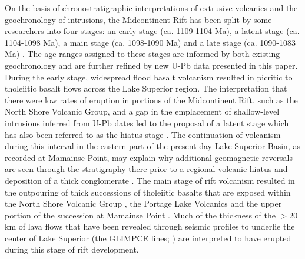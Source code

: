 \documentclass[11pt,letterpaper]{article}
\begin{document}
On the basis of chronostratigraphic interpretations of extrusive volcanics and the geochronology of intrusions, the Midcontinent Rift has been split by some researchers into four stages: an early stage (ca. 1109-1104 Ma), a latent stage (ca. 1104-1098 Ma), a main stage (ca. 1098-1090 Ma) and a late stage (ca. 1090-1083 Ma) \citep{Miller1996a, Davis1997a, Vervoort2007a}. The age ranges assigned to these stages are informed by both existing geochronology and are further refined by new U-Pb data presented in this paper. During the early stage, widespread flood basalt volcanism resulted in picritic to tholeiitic basalt flows across the Lake Superior region. The interpretation that there were low rates of eruption in portions of the Midcontinent Rift, such as the North Shore Volcanic Group, and a gap in the emplacement of shallow-level intrusions inferred from U-Pb dates \citep{Davis1997a, Vervoort2007a} led to the proposal of a latent stage which has also been referred to as the hiatus stage \citep{Miller2013a}. The continuation of volcanism during this interval in the eastern part of the present-day Lake Superior Basin, as recorded at Mamainse Point, may explain why additional geomagnetic reversals are seen through the stratigraphy there prior to a regional volcanic hiatus and deposition of a thick conglomerate \citep{Swanson-Hysell2014a}. The main stage of rift volcanism resulted in the outpouring of thick successions of tholeiitic basalts that are exposed within the North Shore Volcanic Group \citep{Green1989a}, the Portage Lake Volcanics \citep{Nicholson1997a} and the upper portion of the succession at Mamainse Point \citep{Shirey1994a}. Much of the thickness of the $>$20 km of lava flows that have been revealed through seismic profiles to underlie the center of Lake Superior (the GLIMPCE lines; \citealp{Cannon1992b}) are interpreted to have erupted during this stage of rift development.
\end{document}
